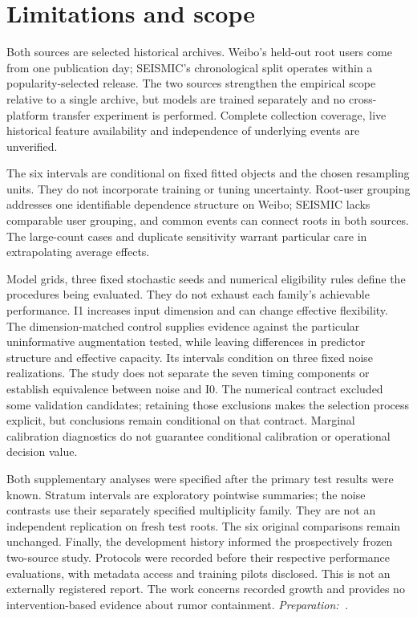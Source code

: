 \hypertarget{limitations-and-scope}{%
\section{Limitations and scope}}

Both sources are selected historical archives. Weibo's held-out root users come from one publication day; SEISMIC's chronological split operates within a popularity-selected release. The two sources strengthen the empirical scope relative to a single archive, but models are trained separately and no cross-platform transfer experiment is performed. Complete collection coverage, live historical feature availability and independence of underlying events are unverified.

The six intervals are conditional on fixed fitted objects and the chosen resampling units. They do not incorporate training or tuning uncertainty. Root-user grouping addresses one identifiable dependence structure on Weibo; SEISMIC lacks comparable user grouping, and common events can connect roots in both sources. The large-count cases and duplicate sensitivity warrant particular care in extrapolating average effects.

Model grids, three fixed stochastic seeds and numerical eligibility rules define the procedures being evaluated. They do not exhaust each family's achievable performance. I1 increases input dimension and can change effective flexibility. The dimension-matched control supplies evidence against the particular uninformative augmentation tested, while leaving differences in predictor structure and effective capacity. Its intervals condition on three fixed noise realizations. The study does not separate the seven timing components or establish equivalence between noise and I0. The numerical contract excluded some validation candidates; retaining those exclusions makes the selection process explicit, but conclusions remain conditional on that contract. Marginal calibration diagnostics do not guarantee conditional calibration or operational decision value.

Both supplementary analyses were specified after the primary test results were known. Stratum intervals are exploratory pointwise summaries; the noise contrasts use their separately specified multiplicity family. They are not an independent replication on fresh test roots. The six original comparisons remain unchanged. Finally, the development history informed the prospectively frozen two-source study. Protocols were recorded before their respective performance evaluations, with metadata access and training pilots disclosed. This is not an externally registered report. The work concerns recorded growth and provides no intervention-based evidence about rumor containment. {\small\textit{Preparation:~\cite{openai2026}.}}
